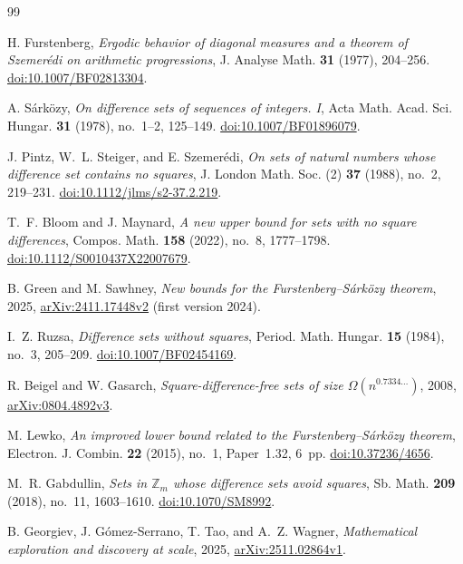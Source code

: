 \documentclass[11pt]{article}
\theoremstyle{definition}
\theoremstyle{remark}
\begin{document}
\begin{thebibliography}{99}

H. Furstenberg,
\emph{Ergodic behavior of diagonal measures and a theorem of
Szemer\'edi on arithmetic progressions},
J. Analyse Math. \textbf{31} (1977), 204--256.
\href{https://doi.org/10.1007/BF02813304}{doi:10.1007/BF02813304}.

A. S\'ark\"ozy,
\emph{On difference sets of sequences of integers. I},
Acta Math. Acad. Sci. Hungar. \textbf{31} (1978), no.~1--2, 125--149.
\href{https://doi.org/10.1007/BF01896079}{doi:10.1007/BF01896079}.

J. Pintz, W.~L. Steiger, and E. Szemer\'edi,
\emph{On sets of natural numbers whose difference set contains no squares},
J. London Math. Soc. (2) \textbf{37} (1988), no.~2, 219--231.
\href{https://doi.org/10.1112/jlms/s2-37.2.219}{doi:10.1112/jlms/s2-37.2.219}.

T.~F. Bloom and J. Maynard,
\emph{A new upper bound for sets with no square differences},
Compos. Math. \textbf{158} (2022), no.~8, 1777--1798.
\href{https://doi.org/10.1112/S0010437X22007679}{doi:10.1112/S0010437X22007679}.

B. Green and M. Sawhney,
\emph{New bounds for the Furstenberg--S\'ark\"ozy theorem},
2025, \href{https://arxiv.org/abs/2411.17448v2}{arXiv:2411.17448v2}
(first version 2024).

I.~Z. Ruzsa, \emph{Difference sets without squares},
Period. Math. Hungar. \textbf{15} (1984), no.~3, 205--209.
\href{https://doi.org/10.1007/BF02454169}{doi:10.1007/BF02454169}.

R. Beigel and W. Gasarch,
\emph{Square-difference-free sets of size $\Omega(n^{0.7334\ldots})$},
2008, \href{https://arxiv.org/abs/0804.4892v3}{arXiv:0804.4892v3}.

M. Lewko,
\emph{An improved lower bound related to the
Furstenberg--S\'ark\"ozy theorem},
Electron. J. Combin. \textbf{22} (2015), no.~1, Paper~1.32, 6~pp.
\href{https://doi.org/10.37236/4656}{doi:10.37236/4656}.

M.~R. Gabdullin,
\emph{Sets in $\mathbb Z_m$ whose difference sets avoid squares},
Sb. Math. \textbf{209} (2018), no.~11, 1603--1610.
\href{https://doi.org/10.1070/SM8992}{doi:10.1070/SM8992}.

B. Georgiev, J. G\'omez-Serrano, T. Tao, and A.~Z. Wagner,
\emph{Mathematical exploration and discovery at scale},
2025, \href{https://arxiv.org/abs/2511.02864v1}{arXiv:2511.02864v1}.


\end{thebibliography}
\end{document}

